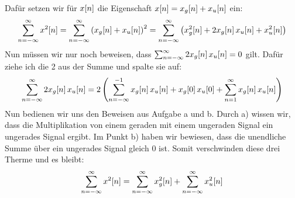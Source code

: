 \begin{enumerate}[a)]
\[		\]
		Dafür setzen wir für $x\negthinspace\left[n\right]$ die Eigenschaft $x\negthinspace\left[n\right]=x_g\negthinspace\left[n\right]+x_u\negthinspace\left[n\right]$ ein:
		\[
			\sum_{n=-\infty}^{\infty}x^2\negthinspace\left[n\right]=\sum_{n=-\infty}^{\infty}\left(x_g\negthinspace\left[n\right]+x_u\negthinspace\left[n\right]\right)^2=\sum_{n=-\infty}^{\infty}\left(x_g^2\negthinspace\left[n\right]+2x_g\negthinspace\left[n\right]x_u\negthinspace\left[n\right]+x_u^2\negthinspace\left[n\right]\right)
		\]
		Nun müssen wir nur noch beweisen, dass $\sum_{n=-\infty}^{\infty}2x_g\negthinspace\left[n\right]x_u\negthinspace\left[n\right]=0$ gilt. Dafür ziehe ich die 2 aus der Summe und spalte sie auf:
		\[
			\sum_{n=-\infty}^{\infty}2x_g\leftn[n\right]x_u\leftn[n\right]=2\left(\sum_{n=-\infty}^{-1}x_g\leftn[n\right]x_u\leftn[n\right]+x_g\leftn[0\right]x_u\leftn[0\right]+\sum_{n=1}^{\infty}x_g\leftn[n\right]x_u\leftn[n\right]\right)
		\]
		Nun bedienen wir uns den Beweisen aus Aufgabe a und b. Durch a) wissen wir, dass die Multiplikation von einem geraden mit einem ungeraden Signal ein ungerades Signal ergibt. Im Punkt b) haben wir bewiesen, dass die unendliche Summe über ein ungerades Signal gleich 0 ist. Somit verschwinden diese drei Therme und es bleibt:
		\[
			\sum_{n=-\infty}^{\infty}x^2\negthinspace\left[n\right]=\sum_{n=-\infty}^{\infty}x_g^2\negthinspace\left[n\right]+\sum_{n=-\infty}^{\infty}x_u^2\negthinspace\left[n\right]
		\]
	\end{enumerate}